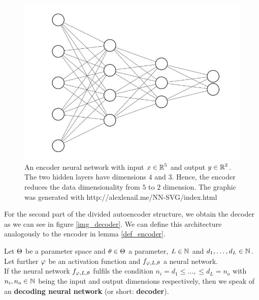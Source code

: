 \begin{figure}[H]
\begin{center}
   \begin{minipage}[b]{0.9\linewidth}
      \includegraphics[width=\linewidth]{encoder}
      \caption{An encoder neural network with input $x\in \operatorname{\mathbb{R}}^5$ and output $y \in \operatorname{\mathbb{R}}^2$. The two hidden layers have dimensions $4$ and $3$. Hence, the encoder reduces the data dimensionality from $5$ to $2$ dimension. The graphic was generated with http://alexlenail.me/NN-SVG/index.html}\label{img_encoder}
	\end{minipage}
\end{center}
\end{figure}


For the second part of the divided autoencoder structure, we obtain the decoder as we can see in figure \ref{img_decoder}. We can define this architecture analogously to the encoder in lemma \ref{def_encoder}.


\begin{lemma}\label{def_decoder}
Let $\operatorname{\Theta}$ be a parameter space and $\theta \in \operatorname{\Theta}$ a parameter, $L\in \operatorname{\mathbb{N}}$ and $d_1,\ldots, d_L\in\operatorname{\mathbb{N}}$. Let further $\operatorname{\varphi}$ be an activation function and $f_{\operatorname{\varphi},L,\theta}$ a neural network.\\
If the neural network $f_{\operatorname{\varphi},L,\theta}$ fulfils the condition $n_i= d_1 \leq \ldots, \leq d_L = n_o$ with $n_i, n_o \in \operatorname{\mathbb{N}}$ being the input and output dimensions respectively, then we speak of an \textbf{decoding neural network} (or short: \textbf{decoder}).
\end{lemma}


